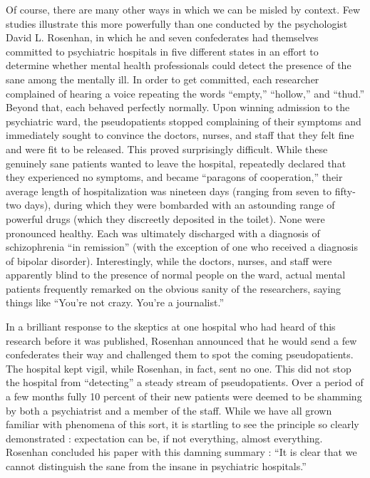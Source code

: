 \documentclass[a4paper,14pt]{extarticle}
\begin{document}
Of course, there are many other ways in which we can be misled by context.
Few studies illustrate this more powerfully than one conducted by the psychologist David L. Rosenhan, in which he and seven confederates had themselves committed to psychiatric hospitals in five different states in an effort to determine whether mental health professionals could detect the presence of the sane among the mentally ill.
In order to get committed, each researcher complained of hearing a voice repeating the words ``empty,'' ``hollow,'' and ``thud.''
Beyond that, each behaved perfectly normally.
Upon winning admission to the psychiatric ward, the pseudopatients stopped complaining of their symptoms and immediately sought to convince the doctors, nurses, and staff that they felt fine and were fit to be released.
This proved surprisingly difficult.
While these genuinely sane patients wanted to leave the hospital, repeatedly declared that they experienced no symptoms, and became ``paragons of cooperation,'' their average length of hospitalization was nineteen days (ranging from seven to fifty-two days), during which they were bombarded with an astounding range of powerful drugs (which they discreetly deposited in the toilet).
None were pronounced healthy.
Each was ultimately discharged with a diagnosis of schizophrenia ``in remission'' (with the exception of one who received a diagnosis of bipolar disorder).
Interestingly, while the doctors, nurses, and staff were apparently blind to the presence of normal people on the ward, actual mental patients frequently remarked on the obvious sanity of the researchers, saying things like ``You’re not crazy. You’re a journalist.”

In a brilliant response to the skeptics at one hospital who had heard of this research before it was published, Rosenhan announced that he would send a few confederates their way and challenged them to spot the coming pseudopatients.
The hospital kept vigil, while Rosenhan, in fact, sent no one.
This did not stop the hospital from ``detecting'' a steady stream of pseudopatients.
Over a period of a few months fully 10 percent of their new patients were deemed to be shamming by both a psychiatrist and a member of the staff.
While we have all grown familiar with phenomena of this sort, it is startling to see the principle so clearly demonstrated :
expectation can be, if not everything, almost everything.
Rosenhan concluded his paper with this damning summary :
``It is clear that we cannot distinguish the sane from the insane in psychiatric hospitals.''
\end{document}

